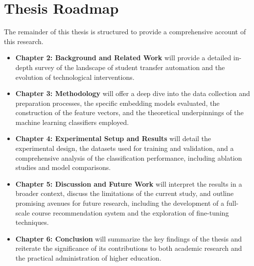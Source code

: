 \section{Thesis Roadmap}
The remainder of this thesis is structured to provide a comprehensive account of this research.
\begin{itemize}
\item \textbf{Chapter 2: Background and Related Work} will provide a detailed in-depth survey of the landscape of student transfer automation and the evolution of technological interventions.
\item \textbf{Chapter 3: Methodology} will offer a deep dive into the data collection and preparation processes, the specific embedding models evaluated, the construction of the feature vectors, and the theoretical underpinnings of the machine learning classifiers employed.
\item \textbf{Chapter 4: Experimental Setup and Results} will detail the experimental design, the datasets used for training and validation, and a comprehensive analysis of the classification performance, including ablation studies and model comparisons.
\item \textbf{Chapter 5: Discussion and Future Work} will interpret the results in a broader context, discuss the limitations of the current study, and outline promising avenues for future research, including the development of a full-scale course recommendation system and the exploration of fine-tuning techniques.
\item \textbf{Chapter 6: Conclusion} will summarize the key findings of the thesis and reiterate the significance of its contributions to both academic research and the practical administration of higher education.
\end{itemize}